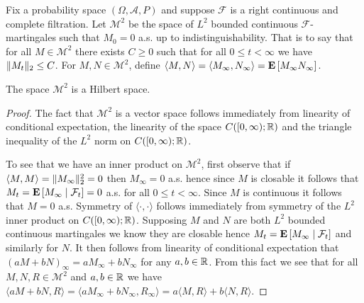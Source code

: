 \begin{defn}Fix a probability space $(\Omega, \mathcal{A}, P)$ and suppose $\mathcal{F}$ is a right continuous and complete filtration.  Let $\mathcal{M}^2$ be the space of $L^2$ bounded continuous $\mathcal{F}$-martingales such that $M_0 = 0$ a.s.  up to indistinguishability.  That is to say that for all $M \in \mathcal{M}^2$ there exists $C \geq 0$ such that for all $0 \leq t < \infty$ we have $\norm{M_t}_2 \leq C$.  For $M, N \in \mathcal{M}^2$, define $\langle M, N \rangle = \langle M_\infty, N_\infty \rangle = \expectation{M_\infty N_\infty }$.
\end{defn}
\begin{lem}\label{ContinuousL2MartingalesHilbert}The space $\mathcal{M}^2$ is a Hilbert space.
\end{lem}
\begin{proof}
The fact that $\mathcal{M}^2$ is a vector space follows immediately from linearity of conditional expectation, the linearity of the space $C([0,\infty); \reals)$ and the triangle inequality of the $L^2$ norm on $C([0,\infty); \reals)$. 
 
To see that we have an inner product on $\mathcal{M}^2$, first observe that if $\langle M, M \rangle = \norm{M_\infty}^2_2 = 0$ then $M_\infty = 0$ a.s. hence since $M$ is closable it follows that $M_t = \cexpectationlong{\mathcal{F}_t}{M_\infty} = 0$ a.s.  for all $0 \leq t < \infty$.  Since $M$ is continuous it follows that $M=0$ a.s.  Symmetry of $\langle \cdot,\cdot \rangle$ follows immediately from symmetry of the $L^2$ inner product on $C([0,\infty); \reals)$.  Supposing $M$ and $N$ are both $L^2$ bounded continuous martingales we know they are closable hence $M_t = \cexpectationlong{\mathcal{F}_t}{M_\infty}$ and similarly for $N$.  It then follows from linearity of conditional expectation that $(aM + bN)_\infty = aM_\infty + bN_\infty$ for any $a,b \in \reals$.  From this fact we see that  for all $M,N,R \in \mathcal{M}^2$ and $a,b \in \reals$ we have $\langle aM + bN, R \rangle = \langle aM_\infty + bN_\infty, R_\infty \rangle = a \langle M, R \rangle + b \langle N, R \rangle$. 


\end{proof}
